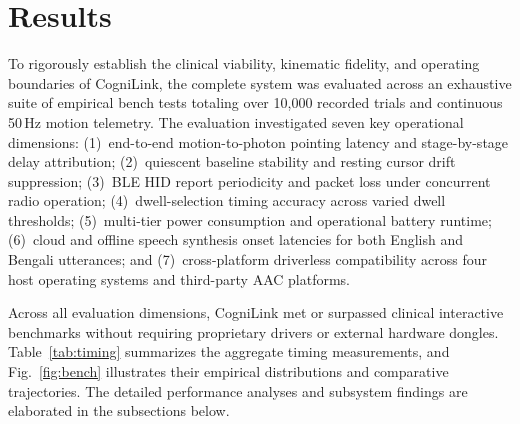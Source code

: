 \documentclass[journal]{IEEEtran}
\begin{document}
\section{Results}
\label{sec:results}

To rigorously establish the clinical viability, kinematic fidelity, and operating boundaries of CogniLink, the complete system was evaluated across an exhaustive suite of empirical bench tests totaling over 10,000 recorded trials and continuous 50\,Hz motion telemetry. The evaluation investigated seven key operational dimensions: (1)~end-to-end motion-to-photon pointing latency and stage-by-stage delay attribution; (2)~quiescent baseline stability and resting cursor drift suppression; (3)~BLE HID report periodicity and packet loss under concurrent radio operation; (4)~dwell-selection timing accuracy across varied dwell thresholds; (5)~multi-tier power consumption and operational battery runtime; (6)~cloud and offline speech synthesis onset latencies for both English and Bengali utterances; and (7)~cross-platform driverless compatibility across four host operating systems and third-party AAC platforms.

Across all evaluation dimensions, CogniLink met or surpassed clinical interactive benchmarks without requiring proprietary drivers or external hardware dongles. Table~\ref{tab:timing} summarizes the aggregate timing measurements, and Fig.~\ref{fig:bench} illustrates their empirical distributions and comparative trajectories. The detailed performance analyses and subsystem findings are elaborated in the subsections below.
\end{document}
